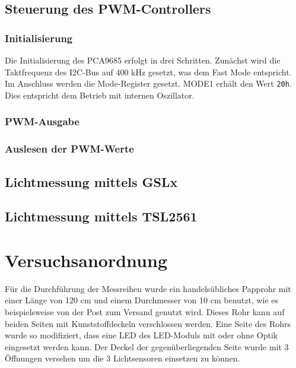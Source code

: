 \documentclass[a4paper,12pt]{scrartcl}
\begin{document}
\subsection{Steuerung des PWM-Controllers}

\subsubsection{Initialisierung}
Die Initialisierung des PCA9685 erfolgt in drei Schritten. Zunächst wird die Taktfrequenz des I2C-Bus auf 400 kHz gesetzt, was dem Fast Mode entspricht. Im
Anschluss werden die Mode-Register gesetzt. MODE1 erhält den Wert \texttt{20h}.
Dies entspricht dem Betrieb mit internen Oszillator.

\subsubsection{PWM-Ausgabe}
\subsubsection{Auslesen der PWM-Werte}
\subsection{Lichtmessung mittels GSLx}
\subsection{Lichtmessung mittels TSL2561}

\clearpage
\section{Versuchsanordnung}
Für die Durchführung der Messreihen wurde ein handelsübliches Papprohr mit
einer Länge von 120 cm und einem Durchmesser von 10 cm benutzt, wie es beispielsweise von der Post zum Versand genutzt wird. Dieses Rohr
kann auf beiden Seiten mit Kunststoffdeckeln verschlossen werden. Eine Seite
des Rohrs wurde so modifiziert, dass eine LED des LED-Moduls mit oder ohne
Optik eingesetzt werden kann. Der Deckel der gegenüberliegenden Seite wurde mit
3 Öffnungen versehen um die 3 Lichtsensoren einsetzen zu können.
\end{document}
